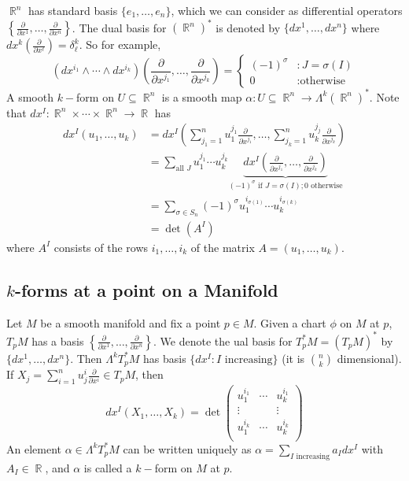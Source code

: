\documentclass[11pt, a4paper]{memoir}
\DeclareMathOperator{\R}{{\mathbb{R}}}
\theoremstyle{change}
\theoremstyle{plain}
\theoremstyle{nonumberplain}
\newcommand{\prt}[2]{\ensuremath{\frac{\partial #1}{\partial #2}}}
\numberwithin{equation}{section}
\begin{document}
$\R^n$ has standard basis $\{e_1,\ldots,e_n\}$, which we can consider as differential operators $\left\{\prt{}{x^1},\ldots,\prt{}{x^n}\right\}$.
The dual basis for $(\R^n)^*$ is denoted by $\{dx^1,\ldots,dx^n\}$ where $dx^k\left(\prt{}{x^\ell}\right)=\delta^k_\ell$.
So for example,
\begin{equation*}
    (dx^{i_1}\wedge\cdots\wedge dx^{i_k})\left(\prt{}{x^{j_1}},\ldots,\prt{}{x^{j_k}}\right)=
    \begin{cases}
        (-1)^\sigma &: J=\sigma(I)\\
        0 &: \text{otherwise}
    \end{cases}
\end{equation*}
A smooth $k-$form on $U\subseteq\R^n$ is a smooth map $\alpha:U\subseteq\R^n\to\Lambda^k(\R^n)^*$.
Note that $dx^I:\R^n\times\cdots\times\R^n\to\R$ has
\begin{align*}
    dx^I(u_1,\ldots,u_k) &= dx^I\left(\sum_{j_1=1}^n u_1^{j_1}\prt{}{x^{j_1}},\ldots,\sum_{j_k=1}^n u_k^{j_j}\prt{}{x^{j_k}}\right)\\
                         &= \sum_{\text{all }J}u_1^{j_1}\cdots u_k^{j_k}\underbrace{dx^I\left(\prt{}{x^{j_1}},\ldots,\prt{}{x^{j_k}}\right)}_{(-1)^\sigma\text{ if }J=\sigma(I);0\text{ otherwise}}\\
                         &= \sum_{\sigma\in S_n}(-1)^\sigma u_1^{i_{\sigma(1)}}\cdots u_k^{i_{\sigma(k)}}\\
                         &= \det(A^I)
\end{align*}
where $A^I$ consists of the rows $i_1,\ldots,i_k$ of the matrix $A=(u_1,\ldots,u_k)$.
\subsection{$k$-forms at a point on a Manifold}
Let $M$ be a smooth manifold and fix a point $p\in M$.
Given a chart $\phi$ on $M$ at $p$, $T_pM$ has a basis $\left\{\prt{}{x^1},\ldots,\prt{}{x^n}\right\}$.
We denote the ual basis for $T_p^*M=(T_pM)^*$ by $\{dx^1,\ldots,dx^n\}$.
Then $\Lambda^kT_p^*M$ has basis $\{dx^I:I\text{ increasing}\}$ (it is $\binom{n}{k}$ dimensional).
If $X_j=\sum_{i=1}^n u_j^i\prt{}{x^i}\in T_pM$, then
\begin{equation*}
    dx^I(X_1,\ldots,X_k) = 
    \det
    \begin{pmatrix}
        u_1^{i_1} &\cdots & u_k^{i_1}\\
        \vdots&&\vdots\\
        u_1^{i_k} &\cdots & u_k^{i_k}\\
    \end{pmatrix}
\end{equation*}
An element $\alpha\in\Lambda^k T_p^*M$ can be written uniquely as $\alpha=\sum_{I\text{ increasing}}a_Idx^I$ with $A_I\in\R$, and $\alpha$ is called a $k-$form on $M$ at $p$.
\end{document}
